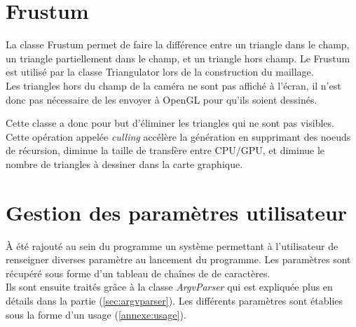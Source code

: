   \section{Frustum}
  La classe Frustum permet de faire la différence entre un triangle dans le champ, un triangle partiellement dans le champ, et un triangle hors champ. Le Frustum est utilisé par la classe Triangulator lors de la construction du maillage.\\
  
  Les triangles hors du champ de la caméra ne sont pas affiché à l'écran, il n'est donc pas nécessaire de les envoyer à OpenGL pour qu'ils soient dessinés. 
  
  Cette classe a donc pour but d'éliminer les triangles qui ne sont pas visibles. Cette opération appelée \textit{culling} accélère la génération en supprimant des noeuds de récursion, diminue la taille de transfère entre CPU/GPU, et diminue le nombre de triangles à dessiner dans la carte graphique.
  
  \section{Gestion des paramètres utilisateur}
  
  À été rajouté au sein du programme un système permettant à l'utilisateur de renseigner diverses paramètre au lancement du programme. Les paramètres sont récupéré sous forme d'un tableau de chaînes de de caractères.\\
  Ils sont ensuite traités grâce à la classe \textit{ArgvParser} qui est expliquée plus en détails dans la partie (\ref{sec:argvparser}). Les différents paramètres sont établies sous la forme d'un usage (\ref{annexe:usage}).
  
 \newpage %
 